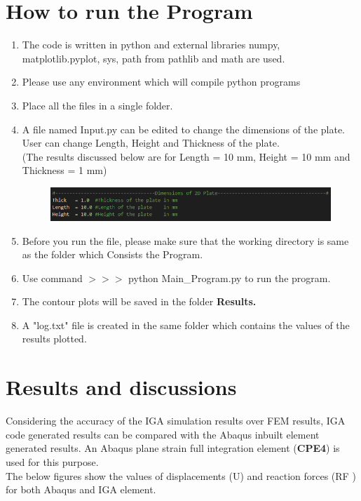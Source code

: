 \documentclass[12pt]{article}
\begin{document}
\section{How to run the Program}
\begin{enumerate}[leftmargin=*]
	\item The code is written in python and external libraries numpy, matplotlib.pyplot, sys, path from pathlib and math are used.
	\item Please use any environment which will compile python programs
	\item Place all the files in a single folder.
	\item A file named Input.py can be edited to change the dimensions of the plate. User can change Length, Height and Thickness of the plate. \\(The results discussed below are for Length = 10 mm, Height = 10 mm and Thickness = 1 mm)
	\begin{figure}[H]
		\begin{center}
			\includegraphics[scale=0.8]{Input.png} 
		\end{center}	
	\end{figure}
	\item Before you run the file, please make sure that the working directory is same as the folder  which
	Consists the Program.
	\item Use command  $>>>$ python Main\_Program.py to run the program.
	\item The contour plots will be saved in the folder \textbf{Results.}
	\item A "log.txt" file is created in the same folder which contains the values of the results plotted.
	 
	
\end{enumerate}
\newpage
\section{Results and discussions} \label{ResultsMech}
Considering the accuracy of the IGA simulation results over FEM results, IGA code generated results can be compared with the Abaqus inbuilt element generated results. An Abaqus plane strain full integration element (\textbf{CPE4}) is used for this purpose.
\\The below figures show the values of displacements (U) and reaction forces (RF ) for both Abaqus and IGA element.\\
\end{document}
